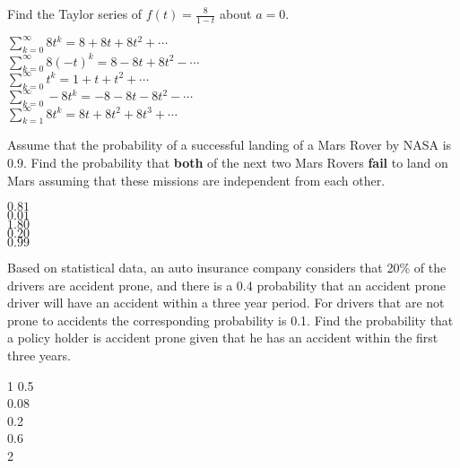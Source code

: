 \documentclass[12pt]{amsart}
\begin{document}
\begin{exam}
\begin{problem}
Find the Taylor series of $f(t)=\frac{8}{1-t}$
about $a=0$.
%
\begin{answers}{1}
$\sum_{k=0}^{\infty}8 t^k=8+8t+8t^2+\cdots$ \\
$\sum_{k=0}^{\infty}8 (-t)^k=8-8t+8t^2-\cdots$\\
$\sum_{k=0}^{\infty} t^k=1+t+t^2+\cdots$ \\
$\sum_{k=0}^{\infty}-8 t^k=-8-8t-8t^2-\cdots$\\
$\sum_{k=1}^{\infty}8 t^k=8t+8t^2+8t^3+\cdots$\\
\end{answers}
\end{problem}





\begin{problem}
Assume that the probability of a successful landing of a
 Mars Rover by NASA is 0.9.  Find the probability that
{\bf both} of the next two Mars Rovers {\bf fail} to
land on Mars assuming that these missions are independent from
each other.

\begin{answers}{1}
$0.81$ \\
$0.01$ \\
$1.80$ \\
$0.20$ \\
$0.99$ \\
\end{answers}
\end{problem}








\begin{problem}
Based on  statistical data, an auto insurance
company considers  that 20\% of the drivers are accident prone, and
there is a 0.4 probability that an accident prone driver will have an
accident within a three year period.   For drivers that are not prone to
accidents the corresponding probability is 0.1.  Find the probability
that a  policy holder is accident prone given that he has an accident
within the first three years.
\begin{answers}1
0.5 \\
0.08 \\
0.2 \\
0.6 \\
2 \\
\end{answers}
\end{problem}








\end{exam}
\end{document}
